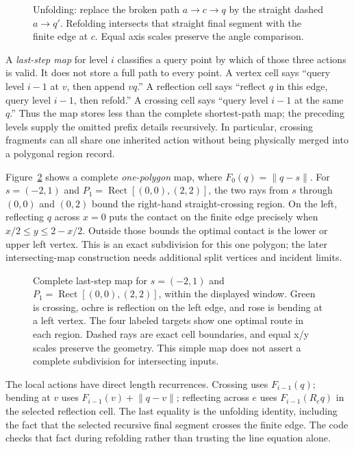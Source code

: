 \documentclass[12pt,a4paper]{article}
\newcommand{\norm}[1]{\lVert#1\rVert}
\newcommand{\Rect}[2]{\operatorname{Rect}\!\left[#1,#2\right]}
\begin{document}
\begin{figure}[h]\centering\figunfold\caption{Unfolding: replace the broken path \(a\to c\to q\) by the straight dashed \(a\to q'\). Refolding intersects that straight final segment with the finite edge at \(c\). Equal axis scales preserve the angle comparison.}\label{fig:unfold}\end{figure}

A \emph{last-step map} for level \(i\) classifies a query point by which of those three actions is valid. It does not store a full path to every point. A vertex cell says ``query level \(i-1\) at \(v\), then append \(vq\).'' A reflection cell says ``reflect \(q\) in this edge, query level \(i-1\), then refold.'' A crossing cell says ``query level \(i-1\) at the same \(q\).'' Thus the map stores less than the complete shortest-path map; the preceding levels supply the omitted prefix details recursively. In particular, crossing fragments can all share one inherited action without being physically merged into a polygonal region record.

Figure~\ref{fig:last} shows a complete \emph{one-polygon} map, where \(F_0(q)=\norm{q-s}\). For \(s=(-2,1)\) and \(P_1=\Rect{(0,0)}{(2,2)}\), the two rays from \(s\) through \((0,0)\) and \((0,2)\) bound the right-hand straight-crossing region. On the left, reflecting \(q\) across \(x=0\) puts the contact on the finite edge precisely when \(x/2\le y\le2-x/2\). Outside those bounds the optimal contact is the lower or upper left vertex. This is an exact subdivision for this one polygon; the later intersecting-map construction needs additional split vertices and incident limits.

\begin{figure}[h]\centering\figlastmap\caption{Complete last-step map for \(s=(-2,1)\) and \(P_1=\Rect{(0,0)}{(2,2)}\), within the displayed window. Green is crossing, ochre is reflection on the left edge, and rose is bending at a left vertex. The four labeled targets show one optimal route in each region. Dashed rays are exact cell boundaries, and equal x/y scales preserve the geometry. This simple map does not assert a complete subdivision for intersecting inputs.}\label{fig:last}\end{figure}

The local actions have direct length recurrences. Crossing uses \(F_{i-1}(q)\); bending at \(v\) uses \(F_{i-1}(v)+\norm{q-v}\); reflecting across \(e\) uses \(F_{i-1}(R_e q)\) in the selected reflection cell. The last equality is the unfolding identity, including the fact that the selected recursive final segment crosses the finite edge. The code checks that fact during refolding rather than trusting the line equation alone.
\end{document}
